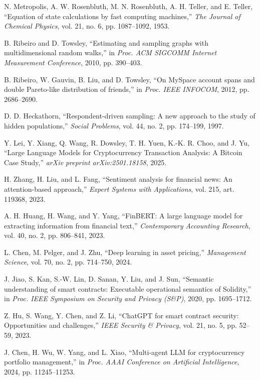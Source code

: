 \begin{thebibliography}{99}
N. Metropolis, A. W. Rosenbluth, M. N. Rosenbluth, A. H. Teller, and E. Teller,
``Equation of state calculations by fast computing machines,''
\textit{The Journal of Chemical Physics}, vol. 21, no. 6, pp. 1087--1092, 1953.

B. Ribeiro and D. Towsley,
``Estimating and sampling graphs with multidimensional random walks,''
in \textit{Proc. ACM SIGCOMM Internet Measurement Conference}, 2010, pp. 390--403.

B. Ribeiro, W. Gauvin, B. Liu, and D. Towsley,
``On MySpace account spans and double Pareto-like distribution of friends,''
in \textit{Proc. IEEE INFOCOM}, 2012, pp. 2686--2690.

D. D. Heckathorn,
``Respondent-driven sampling: A new approach to the study of hidden populations,''
\textit{Social Problems}, vol. 44, no. 2, pp. 174--199, 1997.

Y. Lei, Y. Xiang, Q. Wang, R. Dowsley, T. H. Yuen, K.-K. R. Choo, and J. Yu,
``Large Language Models for Cryptocurrency Transaction Analysis: A Bitcoin Case Study,''
\textit{arXiv preprint arXiv:2501.18158}, 2025.

H. Zhang, H. Liu, and L. Fang,
``Sentiment analysis for financial news: An attention-based approach,''
\textit{Expert Systems with Applications}, vol. 215, art. 119368, 2023.

A. H. Huang, H. Wang, and Y. Yang,
``FinBERT: A large language model for extracting information from financial text,''
\textit{Contemporary Accounting Research}, vol. 40, no. 2, pp. 806--841, 2023.

L. Chen, M. Pelger, and J. Zhu,
``Deep learning in asset pricing,''
\textit{Management Science}, vol. 70, no. 2, pp. 714--750, 2024.

J. Jiao, S. Kan, S.-W. Lin, D. Sanan, Y. Liu, and J. Sun,
``Semantic understanding of smart contracts: Executable operational semantics of Solidity,''
in \textit{Proc. IEEE Symposium on Security and Privacy (S\&P)}, 2020, pp. 1695--1712.

Z. Hu, S. Wang, Y. Chen, and Z. Li,
``ChatGPT for smart contract security: Opportunities and challenges,''
\textit{IEEE Security \& Privacy}, vol. 21, no. 5, pp. 52--59, 2023.

J. Chen, H. Wu, W. Yang, and L. Xiao,
``Multi-agent LLM for cryptocurrency portfolio management,''
in \textit{Proc. AAAI Conference on Artificial Intelligence}, 2024, pp. 11245--11253.


\end{thebibliography}
